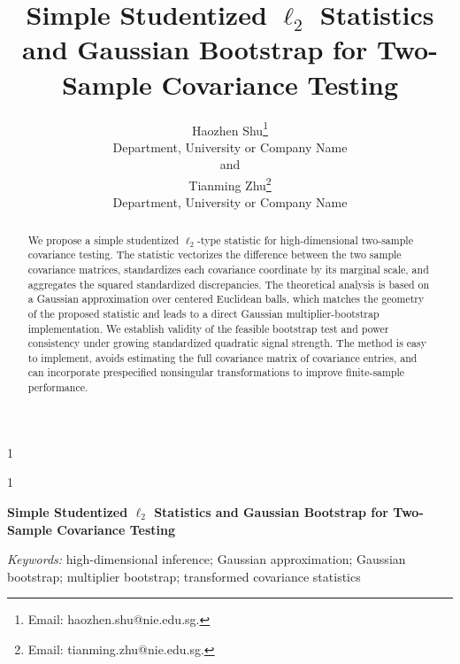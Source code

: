 \documentclass[
  12pt]{article}
\theoremstyle{plain}
\theoremstyle{definition}
\theoremstyle{remark}
\newcommand{\anon}{1}
\begin{document}
\def\spacingset#1{\renewcommand{\baselinestretch}%
{#1}\small\normalsize} \spacingset{1}


\anon
{
  \title{\bf Simple Studentized \texorpdfstring{$\ell_2$}{l2} Statistics and Gaussian Bootstrap for Two-Sample Covariance Testing}
  \author{Haozhen Shu\thanks{Email: haozhen.shu@nie.edu.sg.}\hspace{.2cm}\\
Department, University or Company Name\\
and \\
Tianming Zhu\thanks{Email: tianming.zhu@nie.edu.sg.}\\
Department, University or Company Name}
  \maketitle
} \fi

\anon
{
  \bigskip
  \bigskip
  \bigskip
  \begin{center}
    {\LARGE\bf Simple Studentized \texorpdfstring{$\ell_2$}{l2} Statistics and Gaussian Bootstrap for Two-Sample Covariance Testing}
\end{center}
  \medskip
} \fi

\bigskip
\begin{abstract}
We propose a simple studentized \(\ell_2\)-type statistic for high-dimensional
two-sample covariance testing.  The statistic vectorizes the difference between
the two sample covariance matrices, standardizes each covariance coordinate by
its marginal scale, and aggregates the squared standardized discrepancies. The theoretical analysis is based on a Gaussian approximation over centered
Euclidean balls, which matches the geometry of the proposed statistic and leads
to a direct Gaussian multiplier-bootstrap implementation.  We establish validity of the
feasible bootstrap test and power consistency under growing standardized
quadratic signal strength.  The method is easy to implement, avoids estimating
the full covariance matrix of covariance entries, and can incorporate
prespecified nonsingular transformations to improve finite-sample performance.
\end{abstract}

\noindent%
{\it Keywords:} high-dimensional inference; Gaussian approximation; Gaussian bootstrap; multiplier bootstrap; transformed covariance statistics
\vfill
\end{document}

